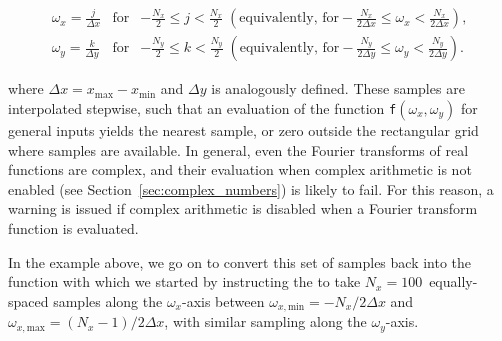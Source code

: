 \begin{eqnarray}
\omega_x = \frac{j}{\Delta x} & \textrm{for} & -\frac{N_x}{2}\leq j <\frac{N_x}{2} \; \left(\textrm{equivalently, for} -\frac{N_x}{2\Delta x}\leq \omega_x <\frac{N_x}{2\Delta x} \right), \nonumber \\
\omega_y = \frac{k}{\Delta y} & \textrm{for} & -\frac{N_y}{2}\leq k <\frac{N_y}{2} \; \left(\textrm{equivalently, for} -\frac{N_y}{2\Delta y}\leq \omega_y <\frac{N_y}{2\Delta y} \right). \nonumber
\end{eqnarray}

\noindent where $\Delta x=x_\mathrm{max}-x_\mathrm{min}$ and $\Delta y$ is
analogously defined. These samples are interpolated stepwise, such that an
evaluation of the function {\tt f}$(\omega_x,\omega_y)$ for general inputs
yields the nearest sample, or zero outside the rectangular grid where samples
are available. In general, even the Fourier transforms of real functions are
complex, and their evaluation when complex arithmetic is not enabled (see
Section~\ref{sec:complex_numbers}) is likely to fail. For this reason, a
warning is issued if complex arithmetic is disabled when a Fourier transform
function is evaluated.

In the example above, we go on to convert this set of samples back into the
function with which we started by instructing the  to take
$N_x=100$~equally-spaced samples along the $\omega_x$-axis between
$\omega_{x,\mathrm{min}}=-{N_x}/{2\Delta x}$ and
$\omega_{x,\mathrm{max}}=(N_x-1)/{2\Delta x}$, with similar sampling along the
$\omega_y$-axis.

